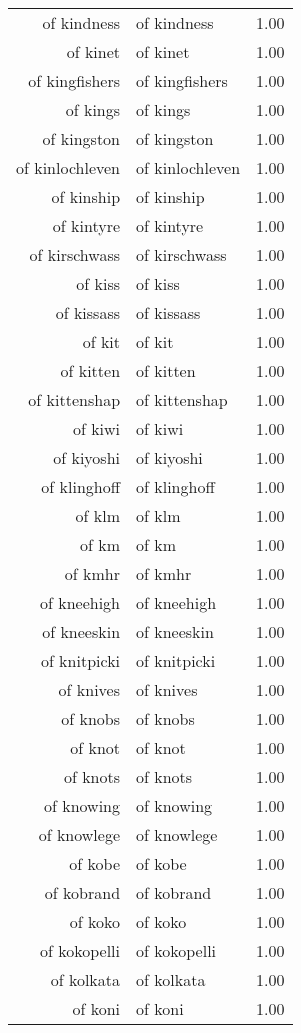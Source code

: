 \begin{table}[ht]
\begin{tabular}{rlr}
  of kindness & of kindness & 1.00 \\ 
  of kinet & of kinet & 1.00 \\ 
  of kingfishers & of kingfishers & 1.00 \\ 
  of kings & of kings & 1.00 \\ 
  of kingston & of kingston & 1.00 \\ 
  of kinlochleven & of kinlochleven & 1.00 \\ 
  of kinship & of kinship & 1.00 \\ 
  of kintyre & of kintyre & 1.00 \\ 
  of kirschwass & of kirschwass & 1.00 \\ 
  of kiss & of kiss & 1.00 \\ 
  of kissass & of kissass & 1.00 \\ 
  of kit & of kit & 1.00 \\ 
  of kitten & of kitten & 1.00 \\ 
  of kittenshap & of kittenshap & 1.00 \\ 
  of kiwi & of kiwi & 1.00 \\ 
  of kiyoshi & of kiyoshi & 1.00 \\ 
  of klinghoff & of klinghoff & 1.00 \\ 
  of klm & of klm & 1.00 \\ 
  of km & of km & 1.00 \\ 
  of kmhr & of kmhr & 1.00 \\ 
  of kneehigh & of kneehigh & 1.00 \\ 
  of kneeskin & of kneeskin & 1.00 \\ 
  of knitpicki & of knitpicki & 1.00 \\ 
  of knives & of knives & 1.00 \\ 
  of knobs & of knobs & 1.00 \\ 
  of knot & of knot & 1.00 \\ 
  of knots & of knots & 1.00 \\ 
  of knowing & of knowing & 1.00 \\ 
  of knowlege & of knowlege & 1.00 \\ 
  of kobe & of kobe & 1.00 \\ 
  of kobrand & of kobrand & 1.00 \\ 
  of koko & of koko & 1.00 \\ 
  of kokopelli & of kokopelli & 1.00 \\ 
  of kolkata & of kolkata & 1.00 \\ 
  of koni & of koni & 1.00 \\ 

\end{tabular}
\end{table}
